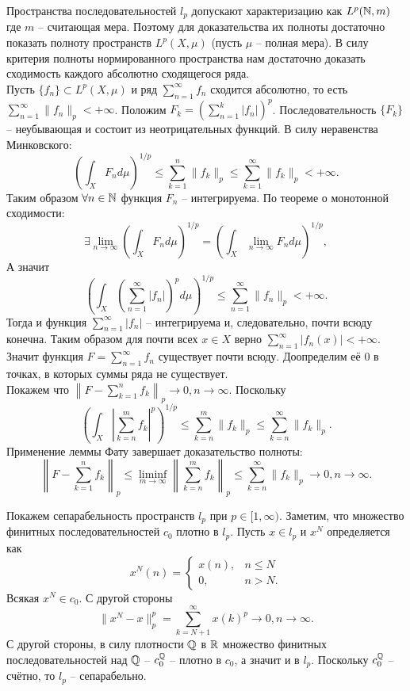 \begin{solve}
    Пространства последовательностей $l_p$ допускают характеризацию как $L^p(\mathbb{N}, m)$ где $m$ -- считающая мера. Поэтому для доказательства их полноты достаточно показать полноту пространств $L^p(X, \mu)$ (пусть $\mu$ -- полная мера). В силу критерия полноты нормированного пространства нам достаточно доказать сходимость каждого абсолютно сходящегося ряда. \\
    Пусть $\{f_n\} \subset L^p(X, \mu)$ и ряд $\sum\limits_{n = 1}^{\infty} f_n$ сходится абсолютно, то есть $\sum\limits_{n = 1}^{\infty} \|f_n\|_p < +\infty$. Положим $F_k = \left(\sum\limits_{n = 1}^k |f_n|\right)^p$. Последовательность $\{F_k\}$ -- неубывающая и состоит из неотрицательных функций. В силу неравенства Минковского:
    \[
        \left(\int_X F_nd\mu\right)^{1/p} \leq \sum\limits_{k = 1}^n \|f_k\|_p \leq \sum\limits_{k = 1}^{\infty}\|f_k\|_p < +\infty.
    \]
    Таким образом $\forall n \in \mathbb{N}$ функция $F_n$ -- интегрируема.
    По теореме о монотонной сходимости:
    \[
        \exists \lim\limits_{n \rightarrow \infty} \left(\int_X F_n d\mu\right)^{1/p} = \left(\int_X \lim\limits_{n \rightarrow \infty} F_n d\mu\right)^{1/p},
    \]
    А значит
    \[
        \left(\int_X \left(\sum\limits_{n = 1}^{\infty} |f_n|\right)^pd\mu\right)^{1/p} \leq \sum\limits_{n = 1}^{\infty} \|f_n\|_p < +\infty.
    \]
    Тогда и функция $\sum\limits_{n = 1}^{\infty} |f_n|$ -- интегрируема и, следовательно, почти всюду конечна. Таким образом для почти всех $x \in X$ верно $\sum\limits_{n = 1}^{\infty} |f_n(x)| < +\infty$. Значит функция $F = \sum\limits_{n = 1}^{\infty} f_n$ существует почти всюду. Доопределим её 0 в точках, в которых суммы ряда не существует. \\
    Покажем что $\left\|F - \sum\limits_{k = 1}^n f_k\right\|_p \rightarrow 0, n \rightarrow \infty$. Поскольку
    \[
        \left(\int_X \left|\sum\limits_{k = n}^m f_k\right|^p\right)^{1/p} \leq \sum\limits_{k = n}^{m} \|f_k\|_p \leq \sum\limits_{k = n}^{\infty}  \|f_k\|_p.
    \]
    Применение леммы Фату завершает доказательство полноты:
    \[
        \left\|F - \sum\limits_{k = 1}^n f_k\right\|_p \leq \liminf_{m \rightarrow \infty} \left\|\sum\limits_{k = n}^{m} f_k\right\|_p \leq \sum\limits_{k = n}^{\infty} \|f_k\|_p \rightarrow 0, n \rightarrow \infty.
    \]


    Покажем сепарабельность пространств $l_p$ при $p \in [1, \infty)$.
    Заметим, что множество финитных последовательностей $c_0$ плотно в $l_p$. Пусть
    $x \in l_p$ и $x^N$ определяется как
    \[
        x^N(n) = \begin{cases}
                     x(n), & n \leq N \\
                     0, & n > N.
        \end{cases}
    \]
    Всякая $x^N \in c_0$. С другой стороны
    \[
        \|x^N - x\|_p^p = \sum\limits_{k = N + 1}^{\infty} x(k)^p \rightarrow 0, n \rightarrow \infty.
    \]
    С другой стороны, в силу плотности $\mathbb{Q}$ в $\mathbb{R}$ множество финитных последовательностей над $\mathbb{Q}$ -- $c_0^{\mathbb{Q}}$ -- плотно в $c_0$, а значит и в $l_p$. Поскольку $c_0^{\mathbb{Q}}$ -- счётно, то $l_p$ -- сепарабельно.


\end{solve}
